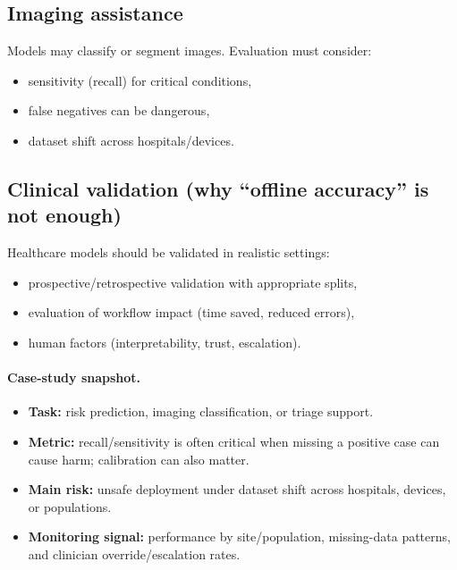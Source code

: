 \documentclass[11pt]{article}
\begin{document}
\subsection{Imaging assistance}
Models may classify or segment images. Evaluation must consider:
\begin{itemize}[leftmargin=*]
  \item sensitivity (recall) for critical conditions,
  \item false negatives can be dangerous,
  \item dataset shift across hospitals/devices.
\end{itemize}

\subsection{Clinical validation (why ``offline accuracy'' is not enough)}
Healthcare models should be validated in realistic settings:
\begin{itemize}[leftmargin=*]
  \item prospective/retrospective validation with appropriate splits,
  \item evaluation of workflow impact (time saved, reduced errors),
  \item human factors (interpretability, trust, escalation).
\end{itemize}

\paragraph{Case-study snapshot.}
\begin{itemize}[leftmargin=*]
  \item \textbf{Task:} risk prediction, imaging classification, or triage support.
  \item \textbf{Metric:} recall/sensitivity is often critical when missing a positive case can cause harm; calibration can also matter.
  \item \textbf{Main risk:} unsafe deployment under dataset shift across hospitals, devices, or populations.
  \item \textbf{Monitoring signal:} performance by site/population, missing-data patterns, and clinician override/escalation rates.
\end{itemize}
\end{document}

